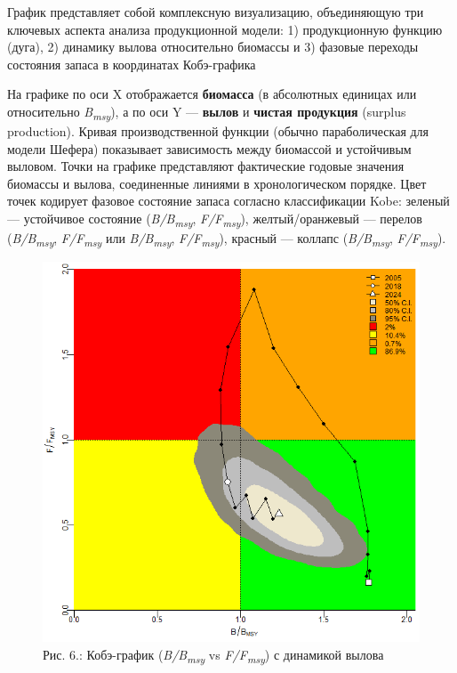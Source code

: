 \documentclass[
  letterpaper,
  DIV=11,
  numbers=noendperiod]{scrreprt}
\begin{document}
График представляет собой комплексную визуализацию, объединяющую три
ключевых аспекта анализа продукционной модели: 1) продукционную функцию
(дуга), 2) динамику вылова относительно биомассы и 3) фазовые переходы
состояния запаса в координатах Кобэ-графика

На графике по оси X отображается \textbf{биомасса} (в абсолютных
единицах или относительно \emph{B\textsubscript{msy}}), а по оси Y ---
\textbf{вылов} и \textbf{чистая продукция} (surplus production). Кривая
производственной функции (обычно параболическая для модели Шефера)
показывает зависимость между биомассой и устойчивым выловом. Точки на
графике представляют фактические годовые значения биомассы и вылова,
соединенные линиями в хронологическом порядке. Цвет точек кодирует
фазовое состояние запаса согласно классификации Kobe: зеленый ---
устойчивое состояние (\emph{B/B\textsubscript{msy}},
\emph{F/F\textsubscript{msy}}), желтый/оранжевый --- перелов
(\emph{B/B\textsubscript{msy}}, \emph{F/F\textsubscript{msy}} или
\emph{B/B\textsubscript{msy}}, \emph{F/F\textsubscript{msy}}), красный
--- коллапс (\emph{B/B\textsubscript{msy}},
\emph{F/F\textsubscript{msy}}).

\begin{figure}[H]

{\centering \includegraphics[width=0.6\linewidth,height=\textheight,keepaspectratio]{images/JABBA6.PNG}

}

\caption{Рис. 6.: Кобэ-график (\emph{B/B\textsubscript{msy}} vs
\emph{F/F\textsubscript{msy}}) с динамикой вылова}

\end{figure}%
\end{document}
